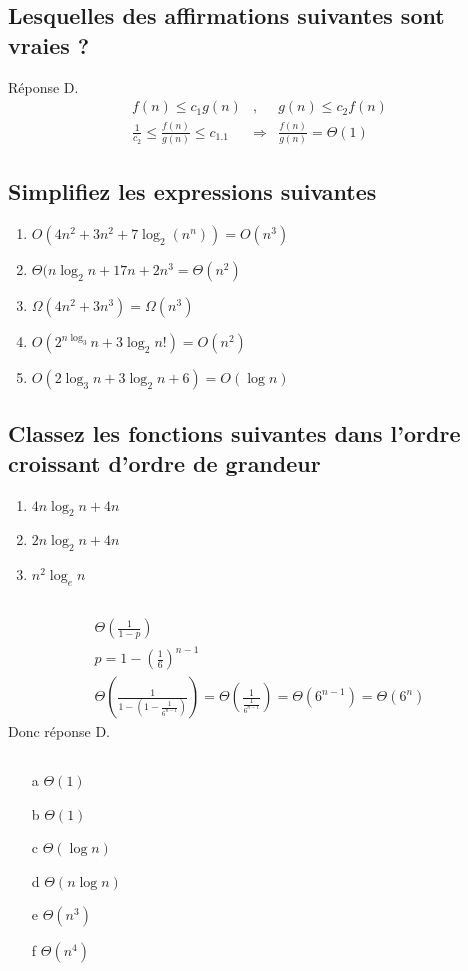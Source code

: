 \subsection{Lesquelles des affirmations suivantes sont vraies ?}
Réponse D. 
\begin{eqnarray*}
	f(n) \leq c_1 g(n)&,& g(n) \leq c_2 f(n)\\
	\frac{1}{c_2} \leq \frac{f(n)}{g(n)} \leq c_1.1 &\Rightarrow& \frac{f(n)}{g(n)} = \Theta(1)
\end{eqnarray*}
\subsection{Simplifiez les expressions suivantes}
\begin{enumerate}
	\item $O(4n^2+3n^2+7\log_2(n^n)) = O(n^3)$ 
	\item $\Theta(n\log_2 n + 17n + 2n^3 = \Theta (n^2)$ 
	\item $\Omega(4n^2 + 3n^3) = \Omega(n^3)$ 
	\item $O(2^{n\log_3}n + 3\log_2 n!) = O(n^2)$
	\item $O(2\log_3 n + 3\log_2 n + 6) = O(\log n)$
\end{enumerate}
\subsection{Classez les fonctions suivantes dans l'ordre croissant d'ordre de grandeur}
\begin{enumerate}
\item $4n \log_2 n + 4n$
\item $2n \log_2 n + 4n$
\item $n^2 \log_e n$
\end{enumerate}

\subsection{}
\begin{eqnarray*}
	\Theta(\frac{1}{1-p})\\
	p = 1 - (\frac{1}{6})^{n-1}\\
	\Theta(\frac{1}{1-(1-\frac{1}{6^{n-1}})}) = \Theta(\frac{1}{\frac{1}{6^{n-1}}}) = \Theta(6^{n-1}) = \Theta(6^n)
\end{eqnarray*}
Donc réponse D.
\subsection{}
\begin{enumerate}
	\item[a]$\Theta(1)$
	\item[b] $\Theta(1)$
	\item[c] $\Theta(\log n)$
	\item[d] $\Theta(n\log n)$
	\item[e] $\Theta(n^3)$
	\item[f] $\Theta(n^4)$
\end{enumerate}


